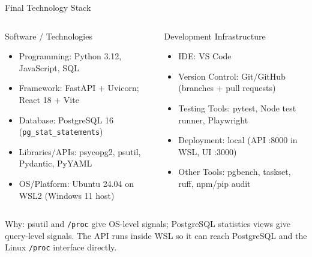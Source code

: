 \documentclass[aspectratio=169,11pt]{beamer}
\newcommand{\smallnote}[1]{%
\vspace{0.08cm}
{\scriptsize\color{GEUGrey}#1}
}
\begin{document}
\begin{frame}{Final Technology Stack}

\begin{columns}[T,totalwidth=\textwidth]


\begin{block}{Software / Technologies}
\begin{itemize}\itemsep2pt\small
    \item Programming: Python 3.12, JavaScript, SQL
    \item Framework: FastAPI + Uvicorn; React 18 + Vite
    \item Database: PostgreSQL 16 (\texttt{pg\_stat\_statements})
    \item Libraries/APIs: psycopg2, psutil, Pydantic, PyYAML
    \item OS/Platform: Ubuntu 24.04 on WSL2 (Windows 11 host)
\end{itemize}
\end{block}


\begin{block}{Development Infrastructure}
\begin{itemize}\itemsep2pt\small
    \item IDE: VS Code
    \item Version Control: Git/GitHub (branches + pull requests)
    \item Testing Tools: pytest, Node test runner, Playwright
    \item Deployment: local (API :8000 in WSL, UI :3000)
    \item Other Tools: pgbench, taskset, ruff, npm/pip audit
\end{itemize}
\end{block}

\end{columns}

\vfill

\smallnote{
Why: psutil and \texttt{/proc} give OS-level signals; PostgreSQL statistics views give
query-level signals. The API runs inside WSL so it can reach PostgreSQL and the Linux
\texttt{/proc} interface directly.
}

\end{frame}
\end{document}

